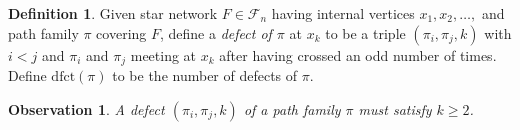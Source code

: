 \documentclass[12pt]{amsart}
\newtheorem{obs}[thm]{Observation}
\theoremstyle{definition}
\newtheorem{defn}[thm]{Definition}%
\numberwithin{equation}{section}
\newcommand{\dfct}{\mathrm{dfct}}
\newcommand{\ctr}[1]{{x}_{#1}}
\newcommand{\ocnet}[1]{\mathcal F_{#1}}%
\begin{document}
\begin{defn}\label{d:defect}
    Given star network  $F \in \ocnet{n}$ having internal vertices $x_1, x_2, \dotsc,$ and 
    path family $\pi$ covering $F$, 
define a {\em defect of $\pi$} at 
$\ctr k$ to be
a triple $(\pi_i, \pi_j, k)$ with
$i < j$
and $\pi_i$ and $\pi_j$ meeting at $\ctr k$ after having crossed an odd number of times. 
Define $\dfct(\pi)$ to be the number of defects of $\pi$.

\end{defn}

\begin{obs}\label{o:defect}
    A defect $(\pi_i, \pi_j, k)$ of a path family $\pi$ must satisfy $k \geq 2$.
\end{obs}
\end{document}

